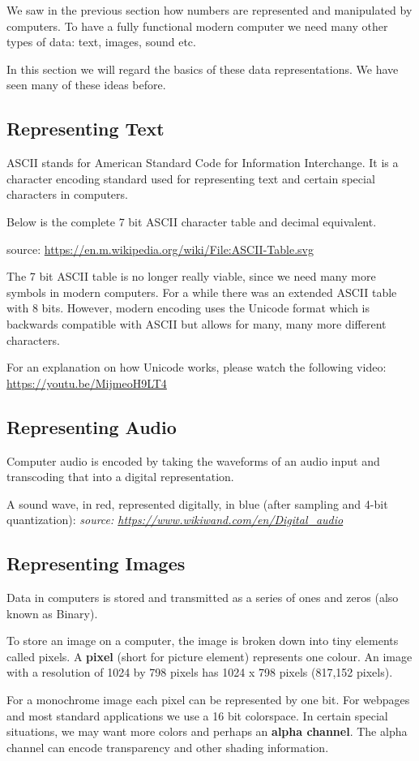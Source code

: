 \documentclass[11pt,a4paper]{report}
\newcommand{\bfb}[1]{{\bf \color{blue} #1}}
\begin{document}
We saw in the previous section how numbers are represented and manipulated by computers. To have a fully functional modern computer we need many other types of data: text, images, sound etc. 

In this section we will regard the basics of these data representations. We have seen many of these ideas before. 

\subsection{Representing Text}

ASCII stands for American Standard Code for Information Interchange. It is a character encoding standard used for representing text and certain special characters in computers. 

Below is the complete 7 bit ASCII character table and decimal equivalent.

\hfill source: {\url{https://en.m.wikipedia.org/wiki/File:ASCII-Table.svg}}

The 7 bit ASCII table is no longer really viable, since we need many more symbols in modern computers. For a while there was an extended ASCII table with 8 bits. However, modern encoding uses the Unicode format which is backwards compatible with ASCII but allows for many, many more different characters.

For an explanation on how Unicode works, please watch the following video: \url{https://youtu.be/MijmeoH9LT4}

\subsection{Representing Audio}

Computer audio is encoded by taking the waveforms of an audio input and transcoding that into a digital representation. 

A sound wave, in red, represented digitally, in blue (after sampling and 4-bit quantization):
\hfill \emph{source: \url{https://www.wikiwand.com/en/Digital_audio}}

\subsection{Representing Images}

Data in computers is stored and transmitted as a series of ones and zeros (also known as Binary). 

To store an image on a computer, the image is broken down into tiny elements called pixels. A \bfb{pixel} (short for picture element) represents one colour. An image with a resolution of 1024 by 798 pixels has 1024 x 798 pixels (817,152 pixels). 

For a monochrome image each pixel can be represented by one bit. For webpages and most standard applications we use a 16 bit colorspace. In  certain special situations, we may want more colors and perhaps an \bfb{alpha channel}. The alpha channel can encode transparency and other shading information.
\end{document}
